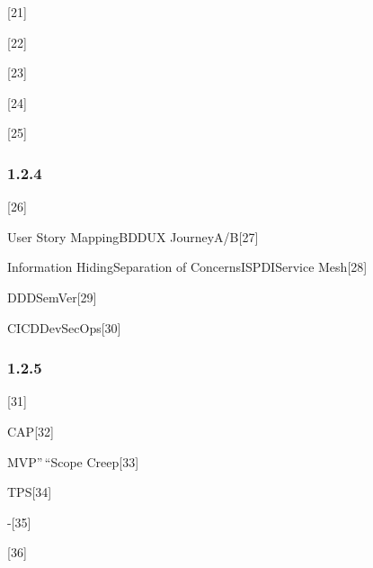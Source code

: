 {[}21{]}


{[}22{]}


{[}23{]}


{[}24{]}


{[}25{]}

\hypertarget{section-19}{%
\subsubsection{1.2.4}\label{section-19}}

{[}26{]}


User Story MappingBDDUX JourneyA/B{[}27{]}


Information HidingSeparation of ConcernsISPDIService Mesh{[}28{]}


DDDSemVer{[}29{]}


CICDDevSecOps{[}30{]}

\hypertarget{section-20}{%
\subsubsection{1.2.5}\label{section-20}}

{[}31{]}


CAP{[}32{]}


MVP''\,``Scope Creep{[}33{]}


TPS{[}34{]}


-{[}35{]}

{[}36{]}

\hypertarget{section-21}{%
\subsection{}\label{section-21}}

\hypertarget{section-22}{%
\subsubsection{}\label{section-22}}

